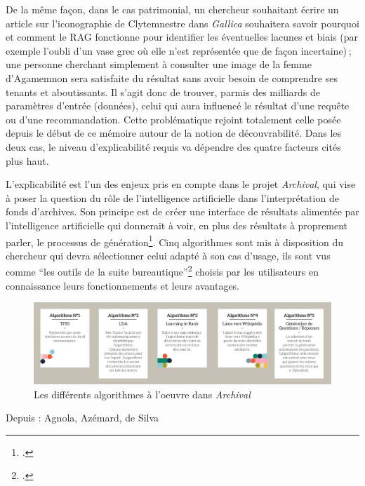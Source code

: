 De la même façon, dans le cas patrimonial, un chercheur souhaitant écrire un article sur l’iconographie de Clytemnestre dans \textit{Gallica} souhaitera savoir pourquoi et comment le RAG fonctionne pour identifier les éventuelles lacunes et biais (par exemple l’oubli d’un vase grec où elle n’est représentée que de façon incertaine) ; une personne cherchant simplement à consulter une image de la femme d’Agamemnon sera satisfaite du résultat sans avoir besoin de comprendre ses tenants et aboutissants. Il s'agit donc de trouver, parmis des milliards de paramètres d'entrée (données), celui qui aura influencé le résultat d’une requête ou d’une recommandation. Cette problématique rejoint totalement celle posée depuis le début de ce mémoire autour de la notion de découvrabilité. Dans les deux cas, le niveau d’explicabilité requis va dépendre des quatre facteurs cités plus haut. 

L’explicabilité est l’un des enjeux pris en compte dans le projet \textit{Archival}, qui vise à poser la question du rôle de l’intelligence artificielle dans l’interprétation de fonds d’archives. Son principe est de créer une interface de résultats alimentée par l’intelligence artificielle qui donnerait à voir, en plus des résultats à proprement parler, le processus de génération\footcite[p. 46]{besnehard_evaluer_nodate}. Cinq algorithmes sont mis à disposition du chercheur qui devra sélectionner celui adapté à son cas d’usage, ils sont vus comme \enquote{les outils de la suite bureautique}\footcite[p. 9]{agnola_ia_2022} choisis par les utilisateurs en connaissance leurs fonctionnements et leurs avantages. 


\begin{figure}[h!]
	\centering
	\includegraphics[width=1\textwidth]{images/image27.png}
	\caption{Les différents algorithmes à l'oeuvre dans \textit{Archival}}
	\label{fig:image27}
\end{figure}

\begin{center}
	Depuis : Agnola, Azémard, de Silva
\end{center}


